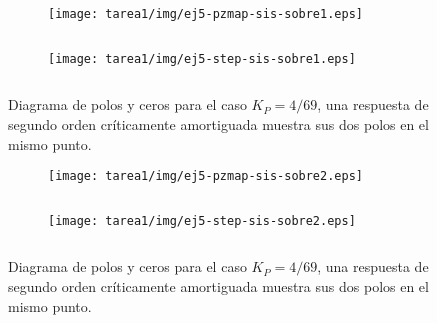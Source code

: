 \begin{ejercicio}
    \begin{figure}[H]
      \centering
      \begin{subfigure}{0.48\textwidth}
        \centering
        \texttt{[image: tarea1/img/ej5-pzmap-sis-sobre1.eps]}
        \caption{$\quad$}
        \label{ej5:img4:a}
      \end{subfigure}
      \begin{subfigure}{0.48\textwidth}
        \centering
        \texttt{[image: tarea1/img/ej5-step-sis-sobre1.eps]}
        \caption{$\quad$}
        \label{ej5:img4:b}
      \end{subfigure}
      \caption{Diagrama de polos y ceros para el caso $K_P = 4/69$, una respuesta de segundo orden críticamente amortiguada muestra sus dos polos en el mismo punto.}
      \label{ej5:img4}
    \end{figure}

    \begin{figure}[H]
      \centering
      \begin{subfigure}{0.48\textwidth}
        \centering
        \texttt{[image: tarea1/img/ej5-pzmap-sis-sobre2.eps]}
        \caption{$\quad$}
        \label{ej5:img5:a}
      \end{subfigure}
      \begin{subfigure}{0.48\textwidth}
        \centering
        \texttt{[image: tarea1/img/ej5-step-sis-sobre2.eps]}
        \caption{$\quad$}
        \label{ej5:img5:b}
      \end{subfigure}
      \caption{Diagrama de polos y ceros para el caso $K_P = 4/69$, una respuesta de segundo orden críticamente amortiguada muestra sus dos polos en el mismo punto.}
      \label{ej5:img5}
    \end{figure}

\end{ejercicio}